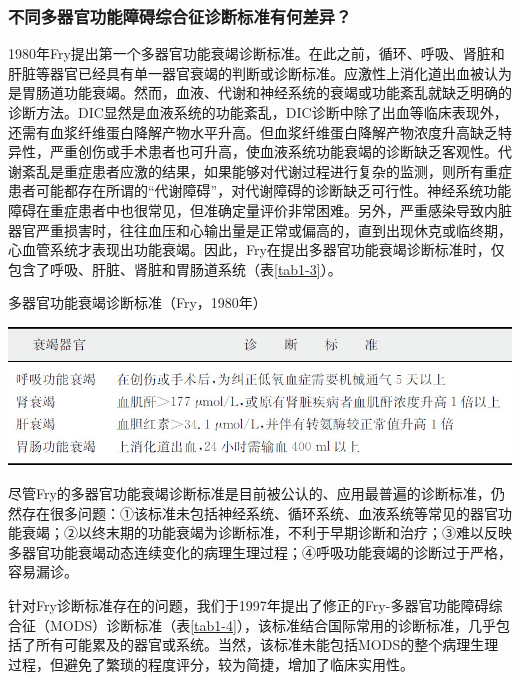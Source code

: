 \subsubsection{不同多器官功能障碍综合征诊断标准有何差异？}

1980年Fry提出第一个多器官功能衰竭诊断标准。在此之前，循环、呼吸、肾脏和肝脏等器官已经具有单一器官衰竭的判断或诊断标准。应激性上消化道出血被认为是胃肠道功能衰竭。然而，血液、代谢和神经系统的衰竭或功能紊乱就缺乏明确的诊断方法。DIC显然是血液系统的功能紊乱，DIC诊断中除了出血等临床表现外，还需有血浆纤维蛋白降解产物水平升高。但血浆纤维蛋白降解产物浓度升高缺乏特异性，严重创伤或手术患者也可升高，使血液系统功能衰竭的诊断缺乏客观性。代谢紊乱是重症患者应激的结果，如果能够对代谢过程进行复杂的监测，则所有重症患者可能都存在所谓的“代谢障碍”，对代谢障碍的诊断缺乏可行性。神经系统功能障碍在重症患者中也很常见，但准确定量评价非常困难。另外，严重感染导致内脏器官严重损害时，往往血压和心输出量是正常或偏高的，直到出现休克或临终期，心血管系统才表现出功能衰竭。因此，Fry在提出多器官功能衰竭诊断标准时，仅包含了呼吸、肝脏、肾脏和胃肠道系统（表\ref{tab1-3}）。

\begin{table}[htbp]
\centering
\caption{多器官功能衰竭诊断标准（Fry，1980年）}
\label{tab1-3}
\includegraphics[width=\textwidth,height=\textheight,keepaspectratio]{./images/Image00006.jpg}
\end{table}

尽管Fry的多器官功能衰竭诊断标准是目前被公认的、应用最普遍的诊断标准，仍然存在很多问题：①该标准未包括神经系统、循环系统、血液系统等常见的器官功能衰竭；②以终末期的功能衰竭为诊断标准，不利于早期诊断和治疗；③难以反映多器官功能衰竭动态连续变化的病理生理过程；④呼吸功能衰竭的诊断过于严格，容易漏诊。

针对Fry诊断标准存在的问题，我们于1997年提出了修正的Fry-多器官功能障碍综合征（MODS）诊断标准（表\ref{tab1-4}），该标准结合国际常用的诊断标准，几乎包括了所有可能累及的器官或系统。当然，该标准未能包括MODS的整个病理生理过程，但避免了繁琐的程度评分，较为简捷，增加了临床实用性。

